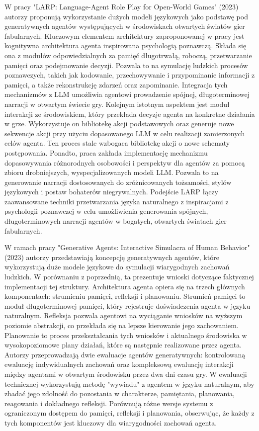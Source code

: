 W pracy "LARP: Language-Agent Role Play for Open-World Games" (2023)\cite{larp_language} autorzy
proponują wykorzystanie dużych modeli językowych jako podstawę pod generatywnych agentów 
występujących w środowiskach otwartych światów gier fabularnych. Kluczowym elementem architektury
zaproponowanej w pracy jest kognitywna architektura agenta inspirowana psychologią poznawczą. Składa
się ona z modułów odpowiedzialnych za pamięć długotrwałą, roboczą, przetwarzanie pamięci oraz
podejmowanie decyzji. Pozwala to na symulację ludzkich procesów poznawczych, takich jak kodowanie,
przechowywanie i przypominanie informacji z pamięci, a także rekonstrukcję zdarzeń oraz zapominanie.
Integracja tych mechanizmów z LLM umożliwia agentowi prowadzenie spójnej, długoterminowej narracji w
otwartym świecie gry. Kolejnym istotnym aspektem jest moduł interakcji ze środowiskiem, który przekłada
decyzje agenta na konkretne działania w grze. Wykorzystuje on bibliotekę akcji podstawowych oraz generuje
nowe sekwencje akcji przy użyciu dopasowanego LLM w celu realizacji zamierzonych celów agenta. Ten proces
stale wzbogaca bibliotekę akcji o nowe schematy postępowania. Ponadto, praca zakłada implementację
mechanizmu dopasowywania różnorodnych osobowości i perspektyw dla agentów za pomocą zbioru
drobniejszych, wyspecjalizowanych modeli LLM. Pozwala to na generowanie narracji dostosowanych do
zróżnicowanych tożsamości, stylów językowych i postaw bohaterów niegrywalnych. Podejście LARP łączy
zaawansowane techniki przetwarzania języka naturalnego z inspiracjami z psychologii poznawczej w celu
umożliwienia generowania spójnych, długoterminowych narracji agentów w bogatych, otwartych światach gier
fabularnych\cite{larp_language}.

W ramach pracy "Generative Agents: Interactive Simulacra of Human Behavior" (2023)\cite{ai_town_ref} autorzy przedstawiają koncepcję
generatywnych agentów, które wykorzystują duże modele językowe do symulacji wiarygodnych zachowań
ludzkich. W porównaniu z poprzednią, ta prezentuje wnioski dotyczące faktycznej implementacji tej struktury.
Architektura agenta opiera się na trzech głównych komponentach: strumieniu pamięci, refleksji
i planowaniu. Strumień pamięci to moduł długoterminowej pamięci, który rejestruje doświadczenia agenta
w języku naturalnym. Refleksja pozwala agentowi na wyciąganie wniosków na wyższym poziomie abstrakcji,
co przekłada się na lepsze kierowanie jego zachowaniem. Planowanie to proces przekształcania tych
wniosków i aktualnego środowiska w wysokopoziomowe plany działań, które są następnie realizowane przez
agenta. Autorzy przeprowadzają dwie ewaluacje agentów generatywnych: kontrolowaną ewaluację indywidualnych 
zachowań oraz kompleksową ewaluację interakcji między agentami w otwartym środowisku przez dwa dni czasu gry. 
W ewaluacji technicznej wykorzystują metodę "wywiadu" z agentem w języku naturalnym, aby zbadać jego zdolność 
do pozostania w charakterze, pamiętania, planowania, reagowania i dokładnego refleksji. Porównują różne 
wersje systemu z ograniczonym dostępem do pamięci, refleksji i planowania, obserwując, że każdy z tych 
komponentów jest kluczowy dla wiarygodności zachowań agenta\cite{ai_town_ref}.


